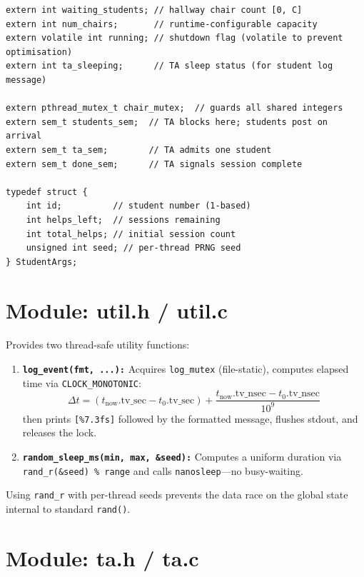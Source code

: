 \documentclass[12pt,a4paper]{report}
\begin{document}
\begin{lstlisting}[caption={shared.h -- shared state and synchronisation declarations.}]
extern int waiting_students; // hallway chair count [0, C]
extern int num_chairs;       // runtime-configurable capacity
extern volatile int running; // shutdown flag (volatile to prevent optimisation)
extern int ta_sleeping;      // TA sleep status (for student log message)

extern pthread_mutex_t chair_mutex;  // guards all shared integers
extern sem_t students_sem;  // TA blocks here; students post on arrival
extern sem_t ta_sem;        // TA admits one student
extern sem_t done_sem;      // TA signals session complete

typedef struct {
    int id;          // student number (1-based)
    int helps_left;  // sessions remaining
    int total_helps; // initial session count
    unsigned int seed; // per-thread PRNG seed
} StudentArgs;
\end{lstlisting}

\section{Module: util.h / util.c}

Provides two thread-safe utility functions:

\begin{enumerate}[leftmargin=2em,itemsep=2pt]
  \item \textbf{\texttt{log\_event(fmt, ...):}} Acquires \texttt{log\_mutex} (file-static),
        computes elapsed time via \texttt{CLOCK\_MONOTONIC}:
        \[
          \Delta t = (t_{\text{now}}.\text{tv\_sec} - t_0.\text{tv\_sec})
                   + \frac{t_{\text{now}}.\text{tv\_nsec} - t_0.\text{tv\_nsec}}{10^9}
        \]
        then prints \texttt{[\%7.3fs]} followed by the formatted message, flushes stdout,
        and releases the lock.
  \item \textbf{\texttt{random\_sleep\_ms(min, max, \&seed):}} Computes a uniform
        duration via \texttt{rand\_r(\&seed) \% range} and calls \texttt{nanosleep}---no
        busy-waiting.
\end{enumerate}

Using \texttt{rand\_r} with per-thread seeds prevents the data race on the global state
internal to standard \texttt{rand()}.

\section{Module: ta.h / ta.c}
\end{document}
